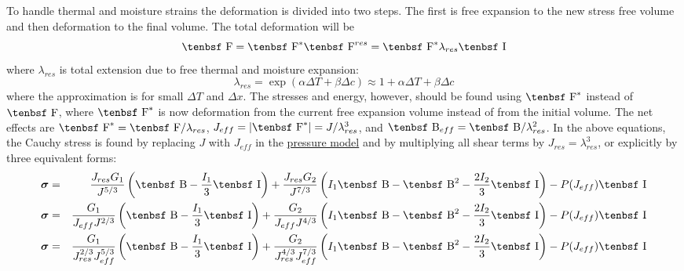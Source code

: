 \documentclass[11pt]{book}
\newcommand{\tens}[1]{\boldsymbol{\mathsf{#1}}}
\def\B{\hbox{\tenbsf B}}
\def\F{\hbox{\tenbsf F}}
\def\I{\hbox{\tenbsf I}}
\def\Jeff{J_{eff}}
\def\Jres{J_{res}}
\begin{document}
To handle thermal and moisture strains the deformation is divided into two steps. The first is free expansion to the new stress free volume and then deformation to the final volume. The total deformation will be
\begin{equation}
      \F = \F^* \F^{res} = \F^* \lambda_{res}\I
\end{equation}
where $\lambda_{res}$ is total extension due to free thermal and moisture expansion:
\begin{equation}
    \lambda_{res} = \exp( \alpha\Delta T + \beta \Delta c) \approx  1 +\alpha\Delta T + \beta \Delta c
\end{equation}
where the approximation is for small $\Delta T$ and $\Delta x$.
The stresses and energy, however, should be found using $\F^*$ instead of $\F$, where $\F^*$ is now deformation from the current free expansion volume instead of from the initial volume. The net effects are $\F^* = \F/\lambda_{res}$, $J_{eff} = |\F^*| = J/\lambda_{res}^3$, and $\B_{eff} = \B/\lambda_{res}^2$. In the above equations, the Cauchy stress is found by replacing $J$ with $J_{eff}$ in the \hyperref[PTerms]{pressure model} and by multiplying all shear terms by $J_{res} = \lambda_{res}^3$, or explicitly by three equivalent forms:
\begin{eqnarray}
     \tens\sigma & = & {\Jres G_1\over J^{5/3}}\left(\B - {I_1\over3}\I\right)
                     +  {\Jres G_2\over J^{7/3}}\left(I_1\B - \B^2 - {2I_2\over3}\I\right)  - P(\Jeff)\I    \\
     \tens\sigma & = & {G_1\over \Jeff J^{2/3}}\left(\B - {I_1\over3}\I\right)
                     +  {G_2\over \Jeff J^{4/3}}\left(I_1\B - \B^2 - {2I_2\over3}\I\right) -  P(\Jeff)\I    \\
     \tens\sigma & = & {G_1\over \Jres^{2/3}\Jeff^{5/3}}\left(\B - {I_1\over3}\I\right)
                     +  {G_2\over \Jres^{4/3}\Jeff^{7/3}}\left(I_1\B - \B^2 - {2I_2\over3}\I\right) -  P(\Jeff)\I
\end{eqnarray}
\end{document}
